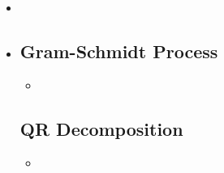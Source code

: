 \begin{itemize}
  \item {}
  \item {}

  \subsection{Gram-Schmidt Process}\label{Gram-Schmidt Process}
  \begin{itemize}
    \item 
  \end{itemize}

  \subsection{QR Decomposition}\label{QR Decomposition}
  \begin{itemize}
    \item 
  \end{itemize}
  
  
\end{itemize}
